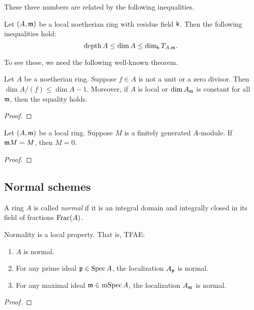     These three numbers are related by the following inequalities.
    \begin{proposition}
        Let $(A,{\mathfrak{m}})$ be a local noetherian ring with residue field $\mathsf{k}$.
        Then the following inequalities hold:
        \[ \operatorname{depth} A \leq \dim A \leq \dim_{\mathsf{k}} T_{A,{\mathfrak{m}}}. \]
    \end{proposition}

    To see these, we need the following well-known theorem.

    
    \begin{theorem}
        Let $A$ be a noetherian ring.
        Suppose $f \in A$ is not a unit or a zero divisor.
        Then $\dim A/(f) \leq \dim A - 1$.
        Moreover, if $A$ is local or $\dim A_{\mathfrak{m}}$ is constant for all ${\mathfrak{m}}$, then the equality holds.
    \end{theorem}
    \begin{proof}
    \end{proof}

    \begin{theorem}
        Let $(A,{\mathfrak{m}})$ be a local ring.
        Suppose $M$ is a finitely generated $A$-module.
        If ${\mathfrak{m}} M = M$, then $M = 0$.
    \end{theorem}
    \begin{proof}
    \end{proof}

\subsection{Normal schemes}


    \begin{definition}
        A ring $A$ is called \textit{normal} if it is an integral domain and integrally closed in its field of fractions $\mathrm{Frac}(A)$.
    \end{definition}

    \begin{proposition}
        Normality is a local property. 
        That is, TFAE:
        \begin{enumerate}[label=(\alph*)]
            \item $A$ is normal.
            \item For any prime ideal ${\mathfrak{p}} \in \operatorname{Spec} A$, the localization $A_{\mathfrak{p}}$ is normal.
            \item For any maximal ideal ${\mathfrak{m}} \in \operatorname{mSpec} A$, the localization $A_{\mathfrak{m}}$ is normal.
        \end{enumerate}
    \end{proposition}
    \begin{proof}
        
    \end{proof}

